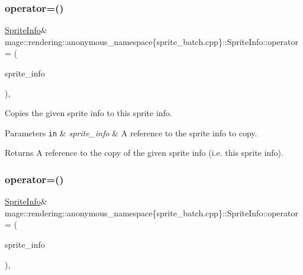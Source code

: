\subsubsection{\texorpdfstring{operator=()}{operator=()}\hspace{0.1cm}{\footnotesize\ttfamily [1/2]}}
{\footnotesize\ttfamily \mbox{\hyperlink{structmage_1_1rendering_1_1anonymous__namespace_02sprite__batch_8cpp_03_1_1_sprite_info}{Sprite\+Info}}\& mage\+::rendering\+::anonymous\+\_\+namespace\{sprite\+\_\+batch.\+cpp\}\+::Sprite\+Info\+::operator= (\begin{DoxyParamCaption}\item[{const \mbox{\hyperlink{structmage_1_1rendering_1_1anonymous__namespace_02sprite__batch_8cpp_03_1_1_sprite_info}{Sprite\+Info}} \&}]{sprite\+\_\+info }\end{DoxyParamCaption})\hspace{0.3cm}{\ttfamily [default]}, {\ttfamily [noexcept]}}

Copies the given sprite info to this sprite info.


\begin{DoxyParams}[1]{Parameters}
\mbox{\tt in}  & {\em sprite\+\_\+info} & A reference to the sprite info to copy. \\
\hline
\end{DoxyParams}
\begin{DoxyReturn}{Returns}
A reference to the copy of the given sprite info (i.\+e. this sprite info). 
\end{DoxyReturn}
\mbox{\label{structmage_1_1rendering_1_1anonymous__namespace_02sprite__batch_8cpp_03_1_1_sprite_info_ae7033feb2629de06f6d84b2178be0c02}} 
\subsubsection{\texorpdfstring{operator=()}{operator=()}\hspace{0.1cm}{\footnotesize\ttfamily [2/2]}}
{\footnotesize\ttfamily \mbox{\hyperlink{structmage_1_1rendering_1_1anonymous__namespace_02sprite__batch_8cpp_03_1_1_sprite_info}{Sprite\+Info}}\& mage\+::rendering\+::anonymous\+\_\+namespace\{sprite\+\_\+batch.\+cpp\}\+::Sprite\+Info\+::operator= (\begin{DoxyParamCaption}\item[{\mbox{\hyperlink{structmage_1_1rendering_1_1anonymous__namespace_02sprite__batch_8cpp_03_1_1_sprite_info}{Sprite\+Info}} \&\&}]{sprite\+\_\+info }\end{DoxyParamCaption})\hspace{0.3cm}{\ttfamily [default]}, {\ttfamily [noexcept]}}

